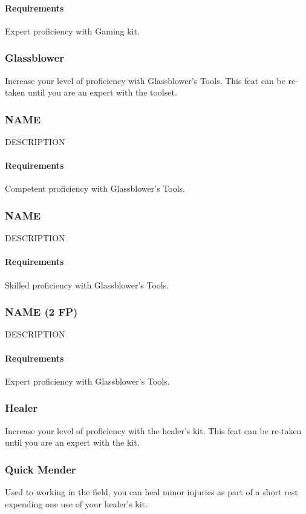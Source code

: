     \paragraph{Requirements} Expert proficiency with Gaming kit.
\subsubsection{Glassblower} \label{feat::glassblower}
    Increase your level of proficiency with Glassblower's Tools.
    This feat can be re-taken until you are an expert with the toolset.
\subsubsection{NAME} \label{feat::name}
    DESCRIPTION
    \paragraph{Requirements} Competent proficiency with Glassblower's Tools.
\subsubsection{NAME} \label{feat::name}
    DESCRIPTION %
    \paragraph{Requirements} Skilled proficiency with Glassblower's Tools.
\subsubsection{NAME (2 FP)} \label{feat::name}
    DESCRIPTION
    \paragraph{Requirements} Expert proficiency with Glassblower's Tools.
\subsubsection{Healer} \label{feat::healer}
    Increase your level of proficiency with the healer's kit.
    This feat can be re-taken until you are an expert with the kit.
\subsubsection{Quick Mender} \label{feat::quickmender}
    Used to working in the field, you can heal minor injuries as part of a short rest expending one use of your healer's kit.

